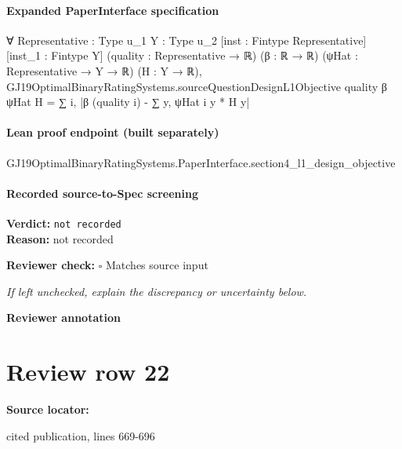 \documentclass[10pt]{article}
\newcommand{\reviewerbox}{%
  \par\noindent\fbox{\parbox{0.96\linewidth}{\rule{0pt}{0.38in}}}\par
}
\newcommand{\reviewmatch}[1]{%
  \par\noindent\textbf{Reviewer check:} $\square$\; #1\par
  \noindent\emph{If left unchecked, explain the discrepancy or uncertainty below.}\par
}
\begin{document}
\paragraph{Expanded PaperInterface specification}
\begin{ReviewVerbatim}
∀ {Representative : Type u_1} {Y : Type u_2} [inst : Fintype Representative] [inst_1 : Fintype Y]
  (quality : Representative → ℝ) (β : ℝ → ℝ) (ψHat : Representative → Y → ℝ) (H : Y → ℝ),
  GJ19OptimalBinaryRatingSystems.sourceQuestionDesignL1Objective quality β ψHat H =
    ∑ i, |β (quality i) - ∑ y, ψHat i y * H y|
\end{ReviewVerbatim}

\paragraph{Lean proof endpoint (built separately)}\begin{ReviewVerbatim}
GJ19OptimalBinaryRatingSystems.PaperInterface.section4_l1_design_objective
\end{ReviewVerbatim}

\paragraph{Recorded source-to-Spec screening}
\textbf{Verdict:} \texttt{not recorded}
\\
\textbf{Reason:} not recorded
\reviewmatch{Matches source input}
\noindent\textbf{Reviewer annotation}\par
\reviewerbox
\clearpage
\hypertarget{source-claim-642a63ff09a11d8b}{}
\section*{Review row 22}
\textbf{Source locator:} {\footnotesize\raggedright cited publication, lines 669-\allowbreak{}696\par}
\end{document}
